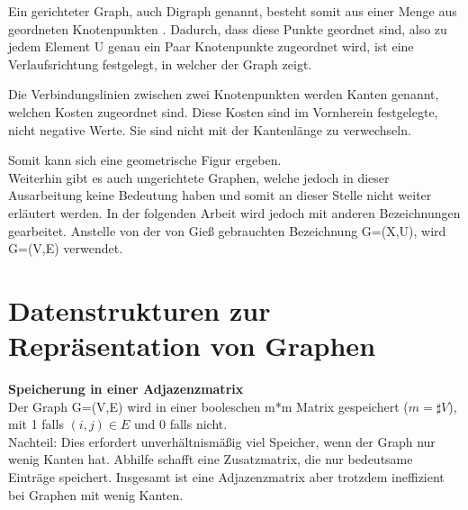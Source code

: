 Ein gerichteter Graph, auch Digraph genannt,  besteht somit aus einer Menge aus geordneten Knotenpunkten \cite[S. 590]{OttWid90}
. Dadurch, dass diese Punkte geordnet sind, also zu jedem Element U genau ein Paar Knotenpunkte zugeordnet wird, ist eine Verlaufsrichtung festgelegt, in welcher der Graph zeigt.

Die Verbindungslinien zwischen zwei Knotenpunkten werden Kanten genannt, welchen Kosten zugeordnet sind. Diese Kosten sind im Vornherein festgelegte, nicht negative Werte. Sie sind  nicht mit der Kantenlänge zu verwechseln.

Somit kann sich eine geometrische Figur ergeben.\\

Weiterhin gibt es auch ungerichtete Graphen, welche jedoch in dieser Ausarbeitung keine Bedeutung haben und somit an dieser Stelle nicht weiter erläutert werden.
In der folgenden Arbeit wird jedoch mit anderen Bezeichnungen gearbeitet. Anstelle von der von Gieß gebrauchten Bezeichnung G=(X,U), wird G=(V,E) verwendet.



\section{Datenstrukturen zur Repräsentation von Graphen}

\textbf{Speicherung in einer Adjazenzmatrix} \\
Der Graph G=(V,E) wird in einer booleschen m*m Matrix gespeichert ($m = \sharp V$), mit 1 falls $(i,j) \in E$ und 0 falls nicht. \\
Nachteil: Dies erfordert unverhältnismäßig viel Speicher, wenn der Graph nur wenig    	  Kanten hat. Abhilfe schafft eine Zusatzmatrix, die nur bedeutsame Einträge speichert.
 Insgesamt ist eine Adjazenzmatrix aber trotzdem ineffizient bei Graphen mit wenig Kanten. 
\cite[S. 539 - 541]{OttWid90} \\
 

